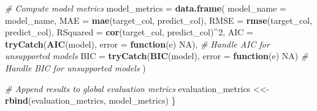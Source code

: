 \documentclass[
]{article}
\newenvironment{Shaded}{\begin{snugshade}}{\end{snugshade}}
\newcommand{\AttributeTok}[1]{\textcolor[rgb]{0.13,0.29,0.53}{#1}}
\newcommand{\CommentTok}[1]{\textcolor[rgb]{0.56,0.35,0.01}{\textit{#1}}}
\newcommand{\ConstantTok}[1]{\textcolor[rgb]{0.56,0.35,0.01}{#1}}
\newcommand{\ControlFlowTok}[1]{\textcolor[rgb]{0.13,0.29,0.53}{\textbf{#1}}}
\newcommand{\DecValTok}[1]{\textcolor[rgb]{0.00,0.00,0.81}{#1}}
\newcommand{\FunctionTok}[1]{\textcolor[rgb]{0.13,0.29,0.53}{\textbf{#1}}}
\newcommand{\NormalTok}[1]{#1}
\newcommand{\OtherTok}[1]{\textcolor[rgb]{0.56,0.35,0.01}{#1}}
\newcommand{\SpecialCharTok}[1]{\textcolor[rgb]{0.81,0.36,0.00}{\textbf{#1}}}
\begin{document}
\begin{Shaded}
\begin{Highlighting}[]
  \CommentTok{\# Compute model metrics}
\NormalTok{  model\_metrics }\OtherTok{=} \FunctionTok{data.frame}\NormalTok{(}
    \AttributeTok{model\_name =}\NormalTok{ model\_name,}
    \AttributeTok{MAE =} \FunctionTok{mae}\NormalTok{(target\_col, predict\_col),}
    \AttributeTok{RMSE =} \FunctionTok{rmse}\NormalTok{(target\_col, predict\_col),}
    \AttributeTok{RSquared =} \FunctionTok{cor}\NormalTok{(target\_col, predict\_col)}\SpecialCharTok{\^{}}\DecValTok{2}\NormalTok{,}
    \AttributeTok{AIC =} \FunctionTok{tryCatch}\NormalTok{(}\FunctionTok{AIC}\NormalTok{(model), }\AttributeTok{error =} \ControlFlowTok{function}\NormalTok{(e) }\ConstantTok{NA}\NormalTok{),  }\CommentTok{\# Handle AIC for unsupported models}
    \AttributeTok{BIC =} \FunctionTok{tryCatch}\NormalTok{(}\FunctionTok{BIC}\NormalTok{(model), }\AttributeTok{error =} \ControlFlowTok{function}\NormalTok{(e) }\ConstantTok{NA}\NormalTok{)   }\CommentTok{\# Handle BIC for unsupported models}
\NormalTok{  )}
  
  \CommentTok{\# Append results to global evaluation metrics}
\NormalTok{  evaluation\_metrics }\OtherTok{\textless{}\textless{}{-}} \FunctionTok{rbind}\NormalTok{(evaluation\_metrics, model\_metrics)}
\NormalTok{\}}
\end{Highlighting}
\end{Shaded}
\end{document}
